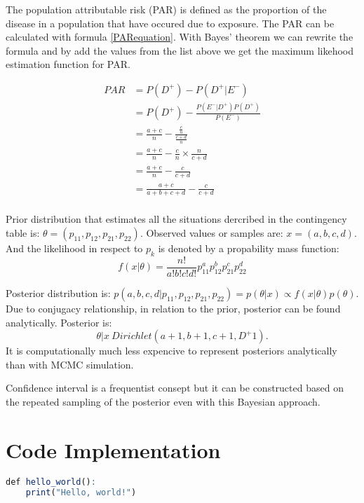The population attributable risk (PAR) is defined as the proportion of the disease in a population that have occured due to exposure. The PAR can be calculated with formula \ref{PARequation}. With Bayes' theorem we can rewrite the formula and by add the values from the list above we get the maximum likehood estimation function for PAR.

\begin{equation}
\begin{split}
PAR &= P(D^+) - P(D^+| E^-) \\
    &= P(D^+) - \frac{P(E^-|D^+)P(D^+)}{P(E^-)} \\
    &= \frac{a + c}{n} - \frac{\frac{c}{n}}{\frac{c + d}{n}} \\
    &= \frac{a + c}{n} - \frac{c}{n} \times  \frac{n}{c + d} \\
    &= \frac{a + c}{n} - \frac{c}{c + d} \\
    &= \frac{a + c}{a + b + c + d} - \frac{c}{c + d} \\
\end{split}
\end{equation}

Prior distribution that estimates all the situations dercribed in the contingency table is: 
$\theta = (p_{11}, p_{12}, p_{21}, p_{22})$. Observed values or samples are: $x = (a, b, c, d)$. And the likelihood in respect to $p_k$ is denoted by a propability mass function: 
\begin{equation}
    f(x|\theta) = \frac{n!}{a!b!c!d!}p_{11}^ap_{12}^bp_{21}^cp_{22}^d
\end{equation}

Posterior distribution is: $p(a,b,c,d|p_{11}, p_{12},p_{21},p_{22}) = p(\theta|x) \varpropto  f (x|\theta)p(\theta)$. Due to conjugacy relationship, in relation to the prior, posterior can be found analytically. Posterior is:
\begin{equation}
    \theta|x ~ Dirichlet(a + 1, b + 1, c + 1, D^+ 1).
\end{equation}
It is computationally much less expencive to represent posteriors analytically than with MCMC simulation. 

Confidence interval is a frequentist consept but it can be constructed based on the repeated sampling of the posterior even with this Bayesian approach. \cite{Pirikahu2016BayesianMO}

\section{Code Implementation} \label{CodeImplementation}
\begin{lstlisting}[language=R]
def hello_world():
    print("Hello, world!")
\end{lstlisting}